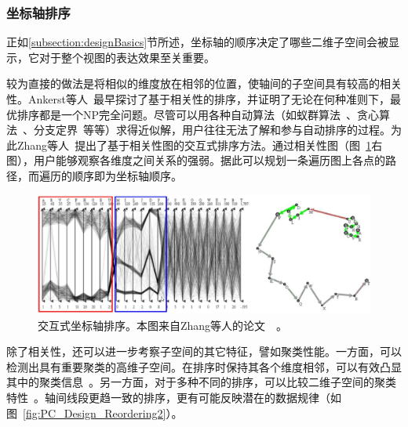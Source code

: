 \documentclass[12pt,twocolumn]{article}
\begin{document}
\subsubsection{坐标轴排序}
正如\ref{subsection:designBasics}节所述，坐标轴的顺序决定了哪些二维子空间会被显示，它对于整个视图的表达效果至关重要。

较为直接的做法是将相似的维度放在相邻的位置，使轴间的子空间具有较高的相关性。Ankerst等人~\citep{ankerst1998similarity}最早探讨了基于相关性的排序，并证明了无论在何种准则下，最优排序都是一个NP完全问题。尽管可以用各种自动算法（如蚁群算法~\citep{ankerst1998similarity}、贪心算法~\citep{johansson2009interactive}、分支定界~\citep{dasgupta2010pargnostics}等等）求得近似解，用户往往无法了解和参与自动排序的过程。为此Zhang等人~\citep{zhang2012network}提出了基于相关性图的交互式排序方法。通过相关性图（图~\ref{fig:PC_Design_Reordering1}右图），用户能够观察各维度之间关系的强弱。据此可以规划一条遍历图上各点的路径，而遍历的顺序即为坐标轴顺序。

\begin{figure}[!htb]
\centering
\includegraphics[width=0.98\linewidth]{images/PC_Design_Reordering1.eps}
\caption{\label{fig:PC_Design_Reordering1}交互式坐标轴排序。本图来自Zhang等人的论文~\citep{zhang2012network}~。
}
\end{figure}

除了相关性，还可以进一步考察子空间的其它特征，譬如聚类性能。一方面，可以检测出具有重要聚类的高维子空间。在排序时保持其各个维度相邻，可以有效凸显其中的聚类信息~\citep{ferdosi2011visualizing}。另一方面，对于多种不同的排序，可以比较二维子空间的聚类特性~\citep{tatu2011automated}。轴间线段更趋一致的排序，更有可能反映潜在的数据规律（如图~\ref{fig:PC_Design_Reordering2}）。
\end{document}
